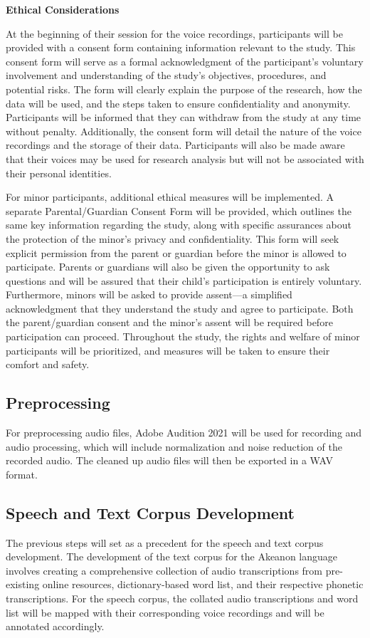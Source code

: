 \textbf{Ethical Considerations}

At the beginning of their session for the voice recordings, participants will be provided with a consent form containing information relevant to the study. This consent form will serve as a formal acknowledgment of the participant's voluntary involvement and understanding of the study's objectives, procedures, and potential risks. The form will clearly explain the purpose of the research, how the data will be used, and the steps taken to ensure confidentiality and anonymity. Participants will be informed that they can withdraw from the study at any time without penalty. Additionally, the consent form will detail the nature of the voice recordings and the storage of their data. Participants will also be made aware that their voices may be used for research analysis but will not be associated with their personal identities.

For minor participants, additional ethical measures will be implemented. A separate Parental/Guardian Consent Form will be provided, which outlines the same key information regarding the study, along with specific assurances about the protection of the minor’s privacy and confidentiality. This form will seek explicit permission from the parent or guardian before the minor is allowed to participate. Parents or guardians will also be given the opportunity to ask questions and will be assured that their child’s participation is entirely voluntary. Furthermore, minors will be asked to provide assent—a simplified acknowledgment that they understand the study and agree to participate. Both the parent/guardian consent and the minor's assent will be required before participation can proceed. Throughout the study, the rights and welfare of minor participants will be prioritized, and measures will be taken to ensure their comfort and safety.

\subsection{Preprocessing}
For preprocessing audio files, Adobe Audition 2021 will be used for recording and audio processing, which will include normalization and noise reduction of the recorded audio. The cleaned up audio files will then be exported in a WAV format.

\subsection{Speech and Text Corpus Development}
The previous steps will set as a precedent for the speech and text corpus development. The development of the text corpus for the Akeanon language involves creating a comprehensive collection of audio transcriptions from pre-existing online resources, dictionary-based word list, and their respective phonetic transcriptions. For the speech corpus, the collated audio transcriptions and word list will be mapped with their corresponding voice recordings and will be annotated accordingly.

